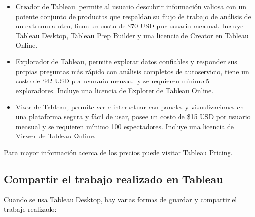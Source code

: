 \documentclass[
]{book}
\providecommand{\tightlist}{%
  \setlength{\itemsep}{0pt}\setlength{\parskip}{0pt}}
\begin{document}
\begin{itemize}
\begin{itemize}
    \begin{itemize}
    \tightlist
    \item
      Creador de Tableau, permite al usuario descubrir información valiosa con un potente conjunto de productos que respaldan su flujo de trabajo de análisis de un extremo a otro, tiene un costo de \$70 USD por usuario mensual. Incluye Tableau Desktop, Tableau Prep Builder y una licencia de Creator en Tableau Online.
    \item
      Explorador de Tableau, permite explorar datos confiables y responder sus propias preguntas más rápido con análisis completos de autoservicio, tiene un costo de \$42 USD por usurario mensual y se requieren mínimo 5 exploradores. Incluye una licencia de Explorer de Tableau Online.
    \item
      Visor de Tableau, permite ver e interactuar con paneles y visualizaciones en una plataforma segura y fácil de usar, posee un costo de \$15 USD por usuario mensual y se requieren mínimo 100 espectadores. Incluye una licencia de Viewer de Tableau Online.
    \end{itemize}
  \end{itemize}
\end{itemize}

Para mayor información acerca de los precios puede visitar \href{https://www.tableau.com/pricing/individual}{Tableau Pricing}.

\hypertarget{compartir-el-trabajo-realizado-en-tableau}{%
\subsection{Compartir el trabajo realizado en Tableau}\label{compartir-el-trabajo-realizado-en-tableau}}

Cuando se usa Tableau Desktop, hay varias formas de guardar y compartir el trabajo realizado:
\end{document}
